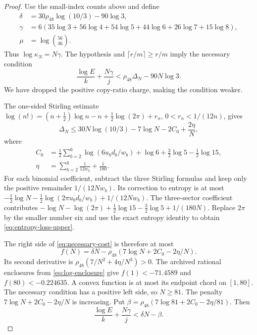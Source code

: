 \begin{proof}
Use the small-index counts above and define
\begin{align*}
 \delta&=30\rho_{48}\log(10/3)-90\log3,\\
 \gamma&=6(35\log3+56\log4+54\log5+44\log6+26\log7+15\log8),\\
 \mu&=\log\binom{56}{36}.
\end{align*}
Thus \(\log\kappa_N=N\gamma\).
The hypothesis and \(\lceil r/m\rceil\ge r/m\) imply the necessary
condition
\begin{equation}\label{eq:necessary-cost}
 \frac{\log E}{k}+\frac{N\gamma}{j}
 <\rho_{48}\Delta_N-90N\log3.
\end{equation}
We have dropped the positive copy-ratio charge, making the condition weaker.

The one-sided Stirling estimate~\citep{Robbins55,DLMF26}
\(\log(n!)=(n+\tfrac12)\log n-n+\tfrac12\log(2\pi)+r_n\),
\(0<r_n<1/(12n)\), gives
\begin{equation}\label{eq:entropy-loss-upper}
 \Delta_N\le30N\log(10/3)-7\log N-2C_0+\frac{2\eta}{N},
\end{equation}
where
\begin{align*}
 C_0&=\frac12\sum_{b=2}^6\log(6u_bd_b/w_b)
       +\log6+\frac32\log5-\frac12\log15,\\
 \eta&=\sum_{b=2}^6\frac1{12w_b}+\frac1{180}.
\end{align*}
For each binomial coefficient, subtract the three Stirling formulas and
keep only the positive remainder \(1/(12Nw_b)\). Its correction to
entropy is at most
\(-\frac12\log N-\frac12\log(2\pi u_bd_b/w_b)+1/(12Nw_b)\).
The three-sector coefficient contributes
\(-\log N-\log(2\pi)+\frac12\log15-\frac32\log5+1/(180N)\).
Replace \(2\pi\) by the smaller number six and use the exact entropy
identity to obtain \eqref{eq:entropy-loss-upper}.

The right side of \eqref{eq:necessary-cost} is therefore at most
\[
 f(N)=\delta N-\rho_{48}(7\log N+2C_0-2\eta/N).
\]
Its second derivative is
\(\rho_{48}(7/N^2+4\eta/N^3)>0\).
The archived rational enclosures from \eqref{eq:log-enclosure} give
\(f(1)<-71.4589\) and \(f(80)<-0.224635\).
A convex function is at most its endpoint chord on \([1,80]\).
The necessary condition has a positive left side, so \(N\ge81\).
The penalty \(7\log N+2C_0-2\eta/N\) is increasing. Put
\(\beta=\rho_{48}(7\log81+2C_0-2\eta/81)\). Then
\begin{equation}\label{eq:necessary-simplified}
 \frac{\log E}{k}+\frac{N\gamma}{j}<\delta N-\beta.
\end{equation}


\end{proof}
